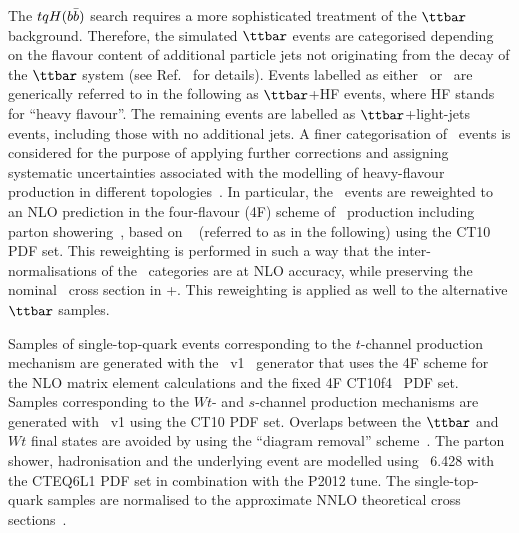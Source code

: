 The $tqH(b\bar{b})$ search requires a more sophisticated treatment of the $\ttbar$ background. Therefore, the simulated $\ttbar$ events are categorised depending 
on the flavour content of additional particle jets not originating from the decay of the $\ttbar$ system (see Ref.~\cite{Aaboud:2017rss} for details).
Events labelled as either \ttbin\ or \ttcin\ are generically referred to in the following as $\ttbar$+HF events, where HF stands for ``heavy flavour''.
The remaining events are labelled as $\ttbar$+light-jets events, including those with no additional jets. 
A finer categorisation of \ttbin\ events is considered for the purpose of applying further corrections and
assigning systematic uncertainties associated with the modelling of heavy-flavour production in different topologies~\cite{Aaboud:2017rss}.
In particular, the \ttbin\ events are reweighted to an NLO prediction in the four-flavour (4F) scheme 
of \ttbin\ production including parton showering~\cite{Cascioli:2013era}, based on {\ShOLlong}~\cite{Gleisberg:2008ta, Cascioli:2011va} (referred to as {\ShOL} 
in the following) using the CT10 PDF set.  This reweighting is performed in such a way that the inter-normalisations of the \ttbin\ categories are at NLO accuracy, 
while preserving the nominal \ttbin\ cross section in {\powheg}+{\pythia}. This reweighting is applied as well to the alternative $\ttbar$ samples.

Samples of single-top-quark events corresponding to the $t$-channel production mechanism are generated with the 
{\powheg}~v1~\cite{Frederix:2012dh} generator that uses the 4F scheme  for the NLO matrix element calculations
and the fixed 4F \textsc{CT10}f\textsc{4}~\cite{Lai:2010vv} PDF set.
Samples corresponding to the $Wt$- and $s$-channel production mechanisms are generated 
with {\powheg}~v1 using the CT10 PDF set. Overlaps between the $\ttbar$ and $Wt$ final states are avoided by using 
the ``diagram removal'' scheme~\cite{Frixione:2005vw}.
The parton shower, hadronisation and the underlying event are modelled using {\pythia}~6.428 with the CTEQ6L1 PDF set 
in combination with the P2012 tune.
The single-top-quark samples are normalised to the approximate NNLO theoretical cross 
sections~\cite{Kidonakis:2011wy,Kidonakis:2010ux,Kidonakis:2010tc}. 

